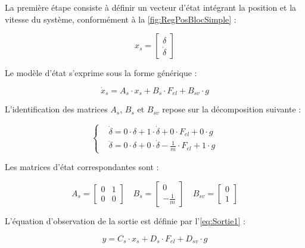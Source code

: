 La première étape consiste à définir un vecteur d'état intégrant la position et la vitesse du système, conformément à la \autoref{fig:RegPosBlocSimple} :

\begin{equation}
    x_s =\left[\begin{matrix} \delta \\ \dot{\delta} \end{matrix}\right]
\end{equation}

Le modèle d'état s'exprime sous la forme générique :

\begin{equation}
    \dot{x}_s = A_s\cdot x_s + B_s\cdot F_{el} + B_{sv}\cdot g
\end{equation}

L'identification des matrices $A_s$, $B_s$ et $B_{sv}$ repose sur la décomposition suivante :

\begin{equation}
    \left\{ \begin{aligned}
         & \dot{\delta} = 0\cdot \delta + 1\cdot \dot{\delta} + 0\cdot F_{el} + 0\cdot g
        \\
         & \ddot{\delta} = 0\cdot \delta + 0\cdot \dot{\delta} - \frac{1}{m}\cdot F_{el} + 1\cdot g
    \end{aligned} \right.
\end{equation}

Les matrices d'état correspondantes sont :

\begin{equation}
    A_s = \begin{bmatrix} 0 & 1 \\ 0 & 0 \end{bmatrix} \quad B_s = \begin{bmatrix} 0 \\ -\frac{1}{m} \end{bmatrix}\quad B_{sv} = \begin{bmatrix} 0 \\ 1 \end{bmatrix}
\end{equation}

L'équation d'observation de la sortie est définie par l'\autoref{eq:Sortie1} :

\begin{equation}
    y = C_s \cdot x_s + D_s \cdot F_{el} + D_{sv} \cdot g
    \label{eq:Sortie1}
\end{equation}

